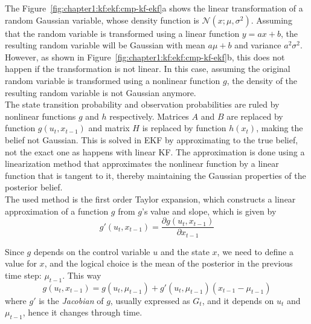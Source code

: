 The Figure~\ref{fig:chapter1:kf:ekf:cmp-kf-ekf}a shows the linear transformation of a random Gaussian variable, whose density function is $\mathcal{N}\left(x; \mu, \sigma^2 \right)$. Assuming that the random variable is transformed using a linear function $y = ax + b$, the resulting random variable will be Gaussian with mean $a\mu + b$ and variance $a^2 \sigma^2$.\\

However, as shown in Figure~\ref{fig:chapter1:kf:ekf:cmp-kf-ekf}b, this does not happen if the transformation is not linear. In this case, assuming the original random variable is transformed using a nonlinear function $g$, the density of the resulting random variable is not Gaussian anymore.\\

The state transition probability and observation probabilities are ruled by nonlinear functions $g$ and $h$ respectively. Matrices $A$ and $B$ are replaced by function $g\left(u_t, x_{t-1}\right)$ and matrix $H$ is replaced by function $h \left(x_t\right)$, making the belief not Gaussian. This is solved in EKF by approximating to the true belief, not the exact one as happens with linear KF. The approximation is done using a linearization method that approximates the nonlinear function by a linear function that is tangent to it, thereby maintaining the Gaussian properties of the posterior belief. \\

The used method is the first order Taylor expansion, which constructs a linear approximation of a function $g$ from $g$'s value and slope, which is given by
\begin{equation}
    g' \left(u_t, x_{t-1}\right) = \frac{\partial g\left(u_t, x_{t-1}\right)}{\partial x_{t-1}}
    \label{eq:chapter1:kf:ekf:g-derivative}
\end{equation}

 Since $g$ depends on the control variable $u$ and the state $x$, we need to define a value for $x$, and the logical choice is the mean of the posterior in the previous time step: $\mu_{t-1}$. This way
 \begin{equation}
    g \left(u_t, x_{t-1}\right) = g \left(u_t, \mu_{t-1}\right) + g' \left(u_t, \mu_{t-1}\right)\left(x_{t-1} - \mu_{t-1}\right)
    \label{eq:chapter1:kf:ekf:g-mean-cov}
 \end{equation}
where $g'$ is the \emph{Jacobian} of $g$, usually expressed as $G_t$, and it depends on $u_t$ and $\mu_{t-1}$, hence it changes through time.\\

